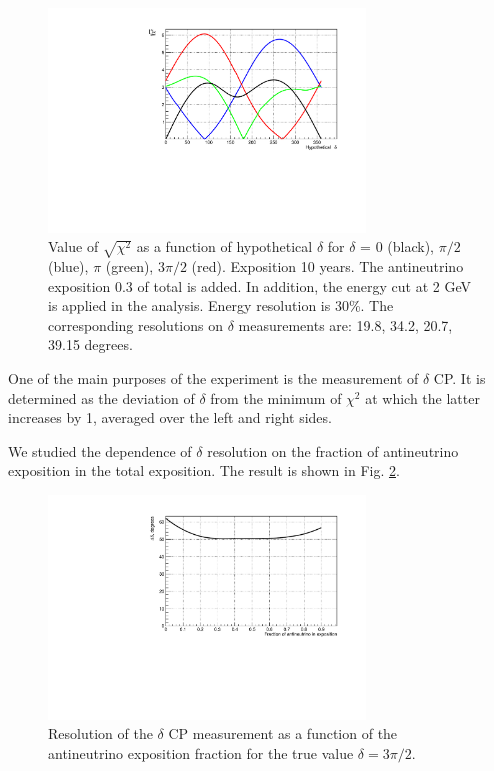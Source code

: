 \documentclass[prd,showpacs,groupedaddress,superscriptaddress,amsmath,amssymb]{revtex4-2} %
\begin{document}
\begin{figure}[h]
\begin{center}
\includegraphics[width=0.75\textwidth]{del_anu10.pdf}
\caption {Value of $\sqrt{\chi^2}$ as a function of hypothetical $\delta$ for $\delta$ = 0 (black), $\pi/2$ (blue), $\pi$ (green), $3\pi/2$ (red).
          Exposition 10 years.
          The antineutrino exposition 0.3 of total is added. In addition, the energy cut at 2 GeV is applied in the analysis. Energy resolution is 30\%.
          The corresponding resolutions on $\delta$ measurements are: 19.8, 34.2, 20.7, 39.15 degrees.
\label{fig:del_anu10}}
\end{center}
\end{figure}

 One of the main purposes of the experiment is the measurement of $\delta$ CP. It is determined as the deviation of $\delta$ from the minimum
of $\chi^2$ at which the latter increases by 1, averaged over the left and right sides.

 We studied the dependence of $\delta$ resolution on the fraction of antineutrino exposition in the total exposition. The result
is shown in Fig. \ref{fig:del_delres_anufrac}.

\begin{figure}[h]
\begin{center}
\includegraphics[width=0.75\textwidth]{del_delres_anufrac.pdf}
\caption {Resolution of the $\delta$ CP measurement as a function of the antineutrino exposition fraction for the true value $\delta = 3\pi/2$.
\label{fig:del_delres_anufrac}}
\end{center}
\end{figure}
\end{document}
